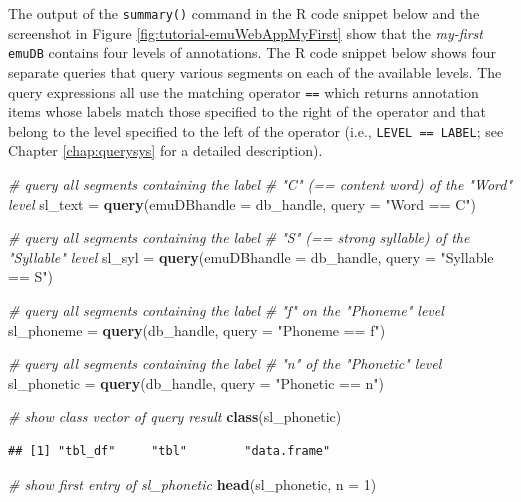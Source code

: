 \documentclass[]{book}
\newenvironment{Shaded}{\begin{snugshade}}{\end{snugshade}}
\newcommand{\CommentTok}[1]{\textcolor[rgb]{0.56,0.35,0.01}{\textit{#1}}}
\newcommand{\DataTypeTok}[1]{\textcolor[rgb]{0.13,0.29,0.53}{#1}}
\newcommand{\DecValTok}[1]{\textcolor[rgb]{0.00,0.00,0.81}{#1}}
\newcommand{\KeywordTok}[1]{\textcolor[rgb]{0.13,0.29,0.53}{\textbf{#1}}}
\newcommand{\NormalTok}[1]{#1}
\newcommand{\StringTok}[1]{\textcolor[rgb]{0.31,0.60,0.02}{#1}}
\begin{document}
The output of the \texttt{summary()} command in the R code snippet below and the screenshot in Figure \ref{fig:tutorial-emuWebAppMyFirst} show that the \emph{my-first} \texttt{emuDB} contains four levels of annotations. The R code snippet below shows four separate queries that query various segments on each of the available levels. The query expressions all use the matching operator \texttt{==} which returns annotation items whose labels match those specified to the right of the operator and that belong to the level specified to the left of the operator (i.e., \texttt{LEVEL\ ==\ LABEL}; see Chapter \ref{chap:querysys} for a detailed description).

\begin{Shaded}
\begin{Highlighting}[]
\CommentTok{# query all segments containing the label}
\CommentTok{# "C" (== content word) of the "Word" level}
\NormalTok{sl_text =}\StringTok{ }\KeywordTok{query}\NormalTok{(}\DataTypeTok{emuDBhandle =}\NormalTok{ db_handle,}
                \DataTypeTok{query =} \StringTok{"Word == C"}\NormalTok{)}

\CommentTok{# query all segments containing the label}
\CommentTok{# "S" (== strong syllable) of the "Syllable" level}
\NormalTok{sl_syl =}\StringTok{ }\KeywordTok{query}\NormalTok{(}\DataTypeTok{emuDBhandle =}\NormalTok{ db_handle,}
               \DataTypeTok{query =} \StringTok{"Syllable == S"}\NormalTok{)}

\CommentTok{# query all segments containing the label}
\CommentTok{# "f" on the "Phoneme" level}
\NormalTok{sl_phoneme =}\StringTok{ }\KeywordTok{query}\NormalTok{(db_handle,}
                   \DataTypeTok{query =} \StringTok{"Phoneme == f"}\NormalTok{)}

\CommentTok{# query all segments containing the label}
\CommentTok{# "n" of the "Phonetic" level}
\NormalTok{sl_phonetic =}\StringTok{ }\KeywordTok{query}\NormalTok{(db_handle,}
                    \DataTypeTok{query =} \StringTok{"Phonetic == n"}\NormalTok{)}

\CommentTok{# show class vector of query result}
\KeywordTok{class}\NormalTok{(sl_phonetic)}
\end{Highlighting}
\end{Shaded}

\begin{verbatim}
## [1] "tbl_df"     "tbl"        "data.frame"
\end{verbatim}

\begin{Shaded}
\begin{Highlighting}[]
\CommentTok{# show first entry of sl_phonetic}
\KeywordTok{head}\NormalTok{(sl_phonetic, }\DataTypeTok{n =} \DecValTok{1}\NormalTok{)}
\end{Highlighting}
\end{Shaded}
\end{document}
